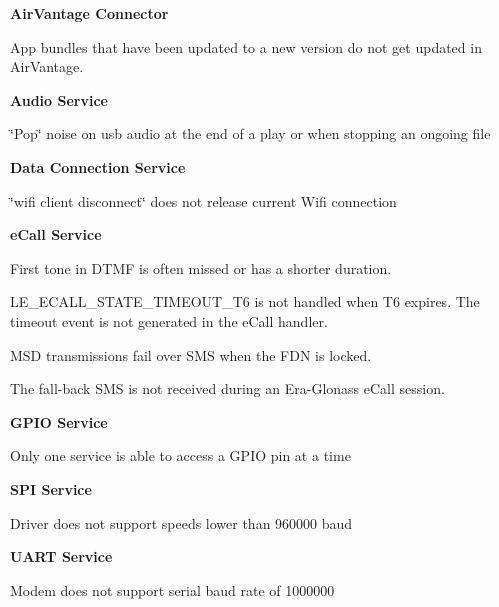 {\bfseries {\bfseries Air\+Vantage} {\bfseries Connector} 
\begin{DoxyItemize}
\item App bundles that have been updated to a new version do not get updated in Air\+Vantage.
\end{DoxyItemize}}

{\bfseries {\bfseries Audio} {\bfseries Service} 
\begin{DoxyItemize}
\item \char`\"{}\+Pop\char`\"{} noise on {\ttfamily usb} audio at the end of a play or when stopping an ongoing file
\end{DoxyItemize}}

{\bfseries {\bfseries Data} {\bfseries Connection} {\bfseries Service} 
\begin{DoxyItemize}
\item \char`\"{}wifi client disconnect\char`\"{} does not release current Wifi connection
\end{DoxyItemize}}

{\bfseries {\bfseries e\+Call} {\bfseries Service} 
\begin{DoxyItemize}
\item First tone in D\+T\+MF is often missed or has a shorter duration.
\item {\ttfamily L\+E\+\_\+\+E\+C\+A\+L\+L\+\_\+\+S\+T\+A\+T\+E\+\_\+\+T\+I\+M\+E\+O\+U\+T\+\_\+\+T6} is not handled when T6 expires. The timeout event is not generated in the e\+Call handler.
\item M\+SD transmissions fail over S\+MS when the F\+DN is locked.
\item The fall-\/back S\+MS is not received during an Era-\/\+Glonass e\+Call session.
\end{DoxyItemize}}

{\bfseries {\bfseries G\+P\+IO} {\bfseries Service} 
\begin{DoxyItemize}
\item Only one service is able to access a G\+P\+IO pin at a time
\end{DoxyItemize}}

{\bfseries {\bfseries S\+PI} {\bfseries Service} 
\begin{DoxyItemize}
\item Driver does not support speeds lower than 960000 baud
\end{DoxyItemize}}

{\bfseries {\bfseries U\+A\+RT} {\bfseries Service} 
\begin{DoxyItemize}
\item Modem does not support serial baud rate of 1000000
\end{DoxyItemize}}

